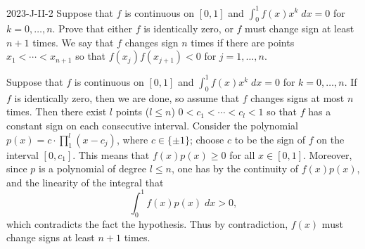 \documentclass{article}
\begin{document}
	\begin{prb}{2023-J-II-2}
		Suppose that $f$ is continuous on $[0,1]$ and $\int_{0}^{1}f(x)x^k\;dx =0$ for $k = 0, \ldots, n$. Prove that either $f$ is identically zero, or $f$ must change sign at least $n + 1$ times. We say that $f$ changes sign $n$ times if there are points $x_1 < \dotsm < x_{n + 1}$ so that $f(x_j) f(x_{j +1}) < 0$ for $j = 1, \ldots, n$. 
	\end{prb}
	Suppose that $f$ is continuous on $[0,1]$ and $\int_{0}^{1}f(x)x^{k}\;dx = 0$ for $k =0, \ldots, n$. If $f$ is identically zero, then we are done, so assume that $f$ changes signs at most $n$ times. Then there exist $l$ points ($l \leq n$) $0 < c_1 < \dotsm < c_l < 1$ so that $f$ has a constant sign on each consecutive interval. Consider the polynomial $p(x) = c \cdot \prod_{1}^{l}(x - c_{j})$, where $c \in \{\pm 1\}$; choose $c$ to be the sign of $f$ on the interval $[0, c_{1}]$. This means that $f(x)p(x) \geq 0$ for all $x \in [0,1]$. Moreover, since $p$ is a polynomial of degree $l \leq n$, one has by the continuity of $f(x)p(x)$, and the linearity of the integral that 
	\begin{equation*}
		\int_{0}^{1}f(x)p(x)\;dx > 0, 
	\end{equation*}
	which contradicts the fact the hypothesis. Thus by contradiction, $f(x)$ must change signs at least $n + 1$ times. 
	
\end{document}
